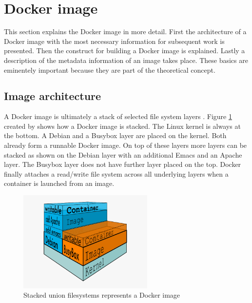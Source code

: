 \section{Docker image}
\label{sec:intro:docker_image:docker_img}
This section explains the Docker image in more detail. 
First the architecture of a Docker image with the most necessary information for subsequent work is presented. 
Then the construct for building a Docker image is explained. 
Lastly a description of the metadata information of an image takes place. 
These basics are eminentely important because they are part of the theoretical concept.

\subsection{Image architecture}
\label{sec:intro:docker_image:docker_img:architecture}
A Docker image is ultimately a stack of selected file system layers \cite{docker_images}.
Figure \ref{sec:intro:docker_image:docker_image_stack} created by \cite{docker_story} shows how a Docker image is stacked. 
The Linux kernel is always at the bottom. A Debian and a Busybox layer are placed on the kernel.
Both already form a runnable Docker image.
On top of these layers more layers can be stacked as shown on the Debian layer with an additional Emacs and an Apache layer. 
The Busybox layer does not have further layer placed on the top.
Docker finally attaches a read/write file system across all underlying layers when a container is launched from an image.
\begin{figure}[htbp]
 \centering
 \includegraphics[width=0.6\textwidth]{gfx/examples/docker-filesystems-busyboxrw}
 \caption{Stacked union filesystems represents a Docker image}
\label{sec:intro:docker_image:docker_image_stack}
\end{figure}

